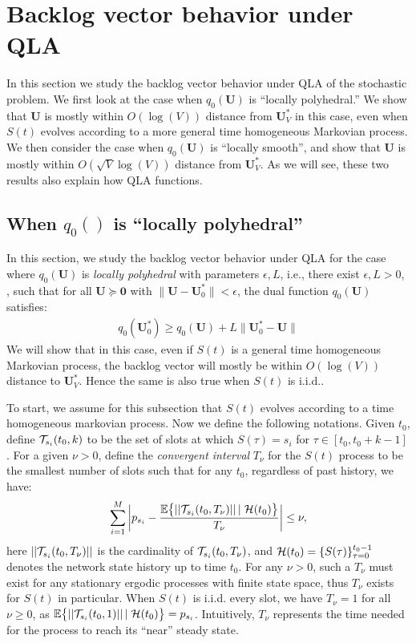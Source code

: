 \documentclass[journal]{IEEEtran}
\newcommand{\expect}[1]{\mathbb{E}\big\{#1\big\}}
\newcommand{\bv}[1]{{\boldsymbol{#1} }}
\newcommand{\script}[1]{{{\cal{#1} }}}
\begin{document}
\section{Backlog vector behavior under QLA}\label{section:qla_multicon}
In this section we study the backlog vector behavior under QLA of the stochastic problem. We first look at the case when $q_0(\bv{U})$ is ``locally polyhedral.'' We show that $\bv{U}$ is mostly within $O(\log(V))$ distance from $\bv{U}^*_V$ in this case, even when $S(t)$ evolves according to a more general time homogeneous Markovian process. 
We then consider the case when $q_0(\bv{U})$ is ``locally smooth'', and show that $\bv{U}$ is mostly within $O(\sqrt{V}\log(V))$ distance from $\bv{U}^*_V$. As we will see, these two results also explain how QLA functions. 

\subsection{When $q_0()$ is ``locally polyhedral''}\label{section:localpolyhedral}
In this section, we study the backlog vector behavior under QLA for the case where $q_0(\bv{U})$ is \emph{locally polyhedral} with parameters $\epsilon, L$, i.e., there exist $\epsilon, L>0$, , such that for all $\bv{U}\succeq \bv{0}$ with $\|\bv{U}-\bv{U}^*_0\|<\epsilon$, the dual function $q_0(\bv{U})$ satisfies:
\begin{eqnarray}
q_0(\bv{U}^*_0)\geq q_0(\bv{U})+L\|\bv{U}^*_0-\bv{U}\|\label{eq:multiple_dual_condition}%
\end{eqnarray} 
We will show that in this case, even if $S(t)$ is a general time homogeneous Markovian process, the backlog vector will mostly be within $O(\log(V))$ distance to $\bv{U}^*_V$. Hence the same is also true when $S(t)$ is i.i.d..

To start, we assume for this subsection that $S(t)$ evolves according to a time homogeneous markovian process. Now we define the following notations. Given $t_0$, define $\script{T}_{s_i}(t_0, k)$ to be the set of slots at which $S(\tau)=s_i$ for $\tau\in[t_0, t_0+k-1]$. For a given $\nu>0$, define the \emph{convergent interval} $T_{\nu}$ \cite{neelypowerjsac} for the $S(t)$ process to be the smallest number of slots such that for any $t_0$, regardless of past history, we have:
\begin{eqnarray}
\sum_{i=1}^M \bigg| p_{s_i}-\frac{\expect{||\script{T}_{s_i}(t_0, T_{\nu})|| \left |\right. \script{H}(t_0)}}{T_{\nu}} \bigg|\leq \nu,
\end{eqnarray}
here $||\script{T}_{s_i}(t_0, T_{\nu})||$ is the cardinality of $\script{T}_{s_i}(t_0, T_{\nu})$, and $\script{H}(t_0)=\{S(\tau)\}_{\tau=0}^{t_0-1}$ denotes the network state history up to time $t_0$. For any $\nu>0$, such a $T_{\nu}$ must exist for any stationary ergodic processes with finite state space, thus $T_{\nu}$ exists for $S(t)$ in particular. When $S(t)$ is i.i.d. every slot, we have $T_{\nu}=1$ for all $\nu\geq0$, as $\expect{||\script{T}_{s_i}(t_0, 1)|| \left |\right. \script{H}(t_0)}=p_{s_i}$. Intuitively, $T_{\nu}$ represents the time needed for the process to reach its ``near'' steady state. 
\end{document}

